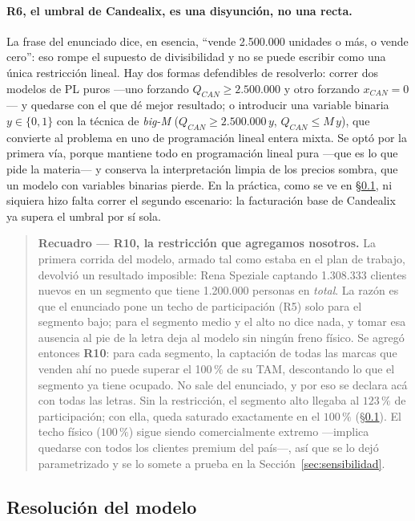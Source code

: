 \documentclass[10pt,a4paper]{article}
\begin{document}
\paragraph{R6, el umbral de Candealix, es una disyunción, no una recta.} La
frase del enunciado dice, en esencia, ``vende 2.500.000 unidades o más, o
vende cero'': eso rompe el supuesto de divisibilidad y no se puede escribir
como una única restricción lineal. Hay dos formas defendibles de resolverlo:
correr dos modelos de PL puros —uno forzando $Q_{CAN}\geq 2{.}500{.}000$ y otro
forzando $x_{CAN}=0$— y quedarse con el que dé mejor resultado; o introducir
una variable binaria $y\in\{0,1\}$ con la técnica de \emph{big-M}
($Q_{CAN}\geq 2.500.000\,y$, $Q_{CAN}\leq M\,y$), que convierte al problema en
uno de programación lineal entera mixta. Se optó por la primera vía, porque
mantiene todo en programación lineal pura —que es lo que pide la
materia— y conserva la interpretación limpia de los precios sombra, que un
modelo con variables binarias pierde. En la práctica, como se ve en
\S\ref{sec:resolucion}, ni siquiera hizo falta correr el segundo escenario:
la facturación base de Candealix ya supera el umbral por sí sola.

\begin{quote}
\small
\textbf{Recuadro — R10, la restricción que agregamos nosotros.}\label{box:r10}
La primera corrida del modelo, armado tal como estaba en el plan de trabajo,
devolvió un resultado imposible: Rena Speziale captando 1.308.333 clientes
nuevos en un segmento que tiene 1.200.000 personas en \emph{total}. La razón es
que el enunciado pone un techo de participación (R5) solo para el segmento
bajo; para el segmento medio y el alto no dice nada, y tomar esa ausencia al
pie de la letra deja al modelo sin ningún freno físico. Se agregó entonces
\textbf{R10}: para cada segmento, la captación de todas las marcas que venden
ahí no puede superar el 100\,\% de su TAM, descontando lo que el segmento ya
tiene ocupado. No sale del enunciado, y por eso se declara acá con todas las
letras. Sin la restricción, el segmento alto llegaba al $123\,\%$ de
participación; con ella, queda saturado exactamente en el $100\,\%$
(\S\ref{sec:resolucion}). El techo físico ($100\,\%$) sigue siendo
comercialmente extremo —implica quedarse con todos los clientes premium del
país—, así que se lo dejó parametrizado y se lo somete a prueba en la
Sección~\ref{sec:sensibilidad}.
\end{quote}

\subsection{Resolución del modelo}
\label{sec:resolucion}
\end{document}
